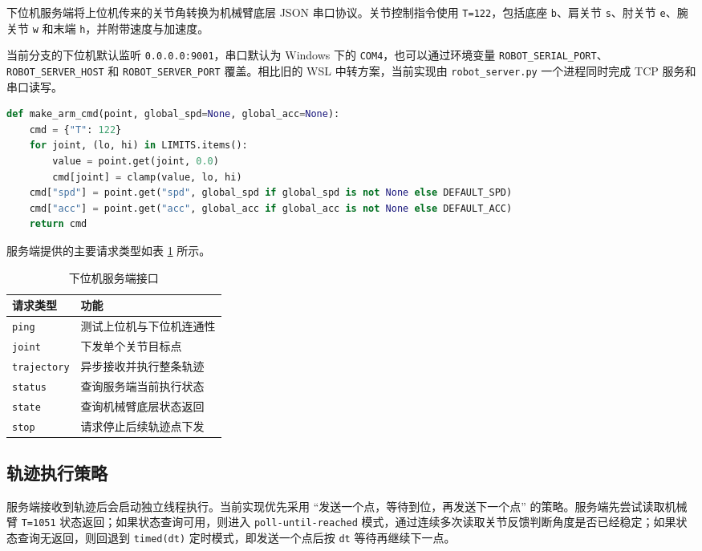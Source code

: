 \documentclass[UTF8,a4paper,12pt]{ctexart}
\begin{document}
下位机服务端将上位机传来的关节角转换为机械臂底层 JSON 串口协议。关节控制指令使用 \texttt{T=122}，包括底座 \texttt{b}、肩关节 \texttt{s}、肘关节 \texttt{e}、腕关节 \texttt{w} 和末端 \texttt{h}，并附带速度与加速度。

当前分支的下位机默认监听 \texttt{0.0.0.0:9001}，串口默认为 Windows 下的 \texttt{COM4}，也可以通过环境变量 \texttt{ROBOT\_SERIAL\_PORT}、\texttt{ROBOT\_SERVER\_HOST} 和 \texttt{ROBOT\_SERVER\_PORT} 覆盖。相比旧的 WSL 中转方案，当前实现由 \texttt{robot\_server.py} 一个进程同时完成 TCP 服务和串口读写。

\begin{lstlisting}[language=Python, caption={下位机串口关节指令生成}]
def make_arm_cmd(point, global_spd=None, global_acc=None):
    cmd = {"T": 122}
    for joint, (lo, hi) in LIMITS.items():
        value = point.get(joint, 0.0)
        cmd[joint] = clamp(value, lo, hi)
    cmd["spd"] = point.get("spd", global_spd if global_spd is not None else DEFAULT_SPD)
    cmd["acc"] = point.get("acc", global_acc if global_acc is not None else DEFAULT_ACC)
    return cmd
\end{lstlisting}

服务端提供的主要请求类型如表 \ref{tab:server_api} 所示。

\begin{table}[H]
  \centering
  \caption{下位机服务端接口}
  \label{tab:server_api}
  \begin{tabular}{ll}
    \toprule
    请求类型 & 功能 \\
    \midrule
    \texttt{ping} & 测试上位机与下位机连通性 \\
    \texttt{joint} & 下发单个关节目标点 \\
    \texttt{trajectory} & 异步接收并执行整条轨迹 \\
    \texttt{status} & 查询服务端当前执行状态 \\
    \texttt{state} & 查询机械臂底层状态返回 \\
    \texttt{stop} & 请求停止后续轨迹点下发 \\
    \bottomrule
  \end{tabular}
\end{table}

\subsection{轨迹执行策略}

服务端接收到轨迹后会启动独立线程执行。当前实现优先采用 ``发送一个点，等待到位，再发送下一个点'' 的策略。服务端先尝试读取机械臂 \texttt{T=1051} 状态返回；如果状态查询可用，则进入 \texttt{poll-until-reached} 模式，通过连续多次读取关节反馈判断角度是否已经稳定；如果状态查询无返回，则回退到 \texttt{timed(dt)} 定时模式，即发送一个点后按 \texttt{dt} 等待再继续下一点。
\end{document}
